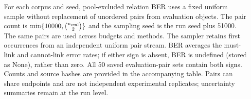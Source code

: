 For each corpus and seed, pool-excluded relation BER uses a fixed uniform sample without replacement of unordered pairs from evaluation objects. The pair count is $\min\{10000,\binom{n_{\rm eval}}{2}\}$ and the sampling seed is the run seed plus 51000. The same pairs are used across budgets and methods. The sampler retains first occurrences from an independent uniform pair stream. BER averages the must-link and cannot-link error rates; if either sign is absent, BER is undefined (stored as None), rather than zero. All 50 saved evaluation-pair sets contain both signs. Counts and source hashes are provided in the accompanying table. Pairs can share endpoints and are not independent experimental replicates; uncertainty summaries remain at the run level.

